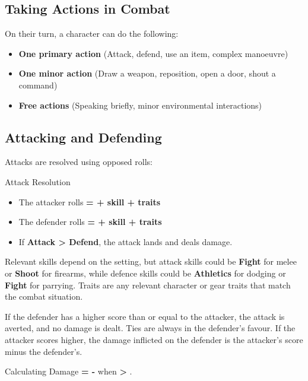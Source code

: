 \begin{multicols}{2}
\subsection{Taking Actions in Combat}

On their turn, a character can do the following:
\begin{itemize}
    \item \textbf{One primary action} (Attack, defend, use an item, complex manoeuvre)
    \item \textbf{One minor action} (Draw a weapon, reposition, open a door, shout a command)
    \item \textbf{Free actions} (Speaking briefly, minor environmental interactions)
\end{itemize}

\subsection{Attacking and Defending}

Attacks are resolved using opposed rolls:
\begin{Example}{Attack Resolution}
	\begin{itemize}
    	\item The attacker rolls \textbf{\Attack = \FudgeRoll + skill + traits}
	    \item The defender rolls \textbf{\Defend = \FudgeRoll + skill + traits} 	    
	    \item If \textbf{Attack > Defend}, the attack lands and deals damage.
	\end{itemize}
\end{Example}

Relevant skills depend on the setting, but attack skills could be \textbf{Fight} for melee or \textbf{Shoot} for firearms, while defence skills could be \textbf{Athletics} for dodging or \textbf{Fight} for parrying. Traits are any relevant character or gear traits that match the combat situation.

If the defender has a higher score than or equal to the attacker, the attack is averted, and no damage is dealt. Ties are always in the defender's favour. If the attacker scores higher, the damage inflicted on the defender is the attacker's score minus the defender's.

\begin{Example}{Calculating Damage}
    \textbf{\Damage = \Attack - \Defend} when \textbf{\Attack > \Defend}.
\end{Example}


\end{multicols}
